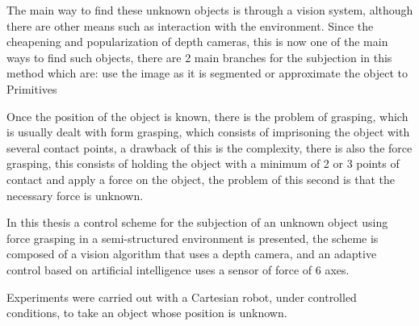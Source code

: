 The main way to find these unknown objects is through a vision system, although there are other means such as interaction with the environment.
Since the cheapening and popularization of depth cameras, this is now one of the main ways to find such objects, there are 2 main branches for the subjection in this method which are: use the image as it is segmented or approximate the object to Primitives

Once the position of the object is known, there is the problem of grasping, which is usually dealt with form grasping, which consists of imprisoning the object with several  contact points, a drawback of this is the complexity, there is also the force grasping, this consists of holding the object with a minimum of 2 or 3 points of contact and apply a force on the object, the problem of this second is that the necessary force is unknown.


In this thesis a control scheme for the subjection of an unknown object using force grasping in a semi-structured environment is presented, the scheme is composed of a vision algorithm that uses a depth camera, and an adaptive control based on artificial intelligence uses a sensor of force of 6 axes.

Experiments were carried out with a Cartesian robot, under controlled conditions, to take an object whose position is unknown.










